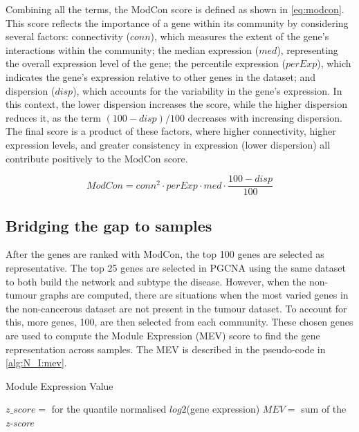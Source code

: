 Combining all the terms, the ModCon score is defined as shown in \cref{eq:modcon}. This score reflects the importance of a gene within its community by considering several factors: connectivity ($conn$), which measures the extent of the gene's interactions within the community; the median expression ($med$), representing the overall expression level of the gene; the percentile expression ($perExp$), which indicates the gene's expression relative to other genes in the dataset; and dispersion ($disp$), which accounts for the variability in the gene's expression. In this context, the lower dispersion increases the score, while the higher dispersion reduces it, as the term $(100 - disp)/100$ decreases with increasing dispersion. The final score is a product of these factors, where higher connectivity, higher expression levels, and greater consistency in expression (lower dispersion) all contribute positively to the ModCon score.

\begin{equation} \label{eq:modcon}
    ModCon = conn^2 \cdot perExp \cdot med \cdot \frac{100 - disp}{100}
\end{equation}

\subsection{Bridging the gap to samples} \label{s:N_I:mev}

After the genes are ranked with ModCon, the top 100 genes are selected as representative. The top 25 genes are selected in PGCNA \citep{Care2019-ij} using the same dataset to both build the network and subtype the disease. However, when the non-tumour graphs are computed, there are situations when the most varied genes in the non-cancerous dataset are not present in the tumour dataset. To account for this, more genes, 100, are then selected from each community. These chosen genes are used to compute the Module Expression (MEV) score \citep{Care2019-ij} to find the gene representation across samples. The MEV is described in the pseudo-code in \cref{alg:N_I:mev}.

\begin{algorithm}
\caption{Module Expression Value }\label{alg:N_I:mev}
    \begin{algorithmic}
            \State $z\_score=$ for the quantile normalised $log2$(gene expression)
                \State $MEV=$ sum of the \textit{z-score}  
            \EndFor
        \EndFor
    \EndFor
    \end{algorithmic}
\end{algorithm}

